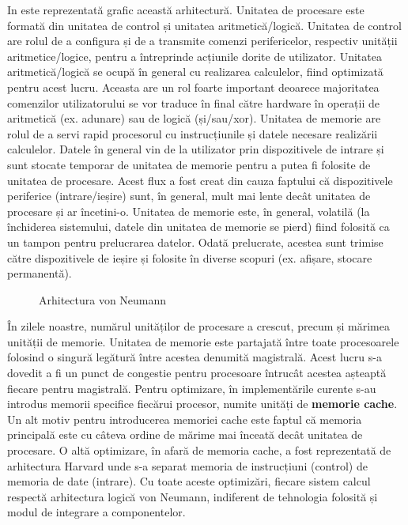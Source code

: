 In  este reprezentată grafic această
arhitectură. Unitatea de procesare este formată din unitatea de control și
unitatea aritmetică/logică. Unitatea de control are rolul de a configura și de a transmite
comenzi perifericelor, respectiv unității aritmetice/logice, pentru a
întreprinde acțiunile dorite de utilizator. Unitatea aritmetică/logică se ocupă
în general cu realizarea calculelor, fiind optimizată pentru acest lucru.
Aceasta are un rol foarte important deoarece majoritatea comenzilor
utilizatorului se vor traduce în final către hardware în operații de aritmetică
(ex. adunare) sau de logică (și/sau/xor). Unitatea de memorie are rolul de a
servi rapid procesorul cu instrucțiunile și datele necesare realizării calculelor. Datele în
general vin de la utilizator prin dispozitivele de intrare și sunt stocate
temporar de unitatea de memorie pentru a putea fi folosite de unitatea de
procesare. Acest flux a fost creat din cauza faptului că dispozitivele
periferice (intrare/ieșire) sunt, în general, mult mai lente decât unitatea de
procesare și ar încetini-o. Unitatea de memorie este, în general, volatilă (la
închiderea sistemului, datele din unitatea de memorie se pierd) fiind folosită
ca un tampon pentru prelucrarea datelor. Odată prelucrate, acestea sunt trimise
către dispozitivele de ieșire și folosite în diverse scopuri (ex. afișare, stocare
permanentă).

\begin{figure}[!htbp]
  \centering
  \def\svgwidth{0.8\columnwidth}
  
  \caption{Arhitectura von Neumann}
  \label{fig:hw:von-neumann}
\end{figure}

În zilele noastre, numărul unităților de procesare a crescut, precum și mărimea
unității de memorie. Unitatea de memorie este partajată între toate
procesoarele folosind o singură legătură între acestea denumită magistrală.
Acest lucru s-a dovedit a fi un punct de congestie pentru procesoare întrucât
acestea așteaptă fiecare pentru magistrală. Pentru optimizare, în implementările
curente s-au introdus memorii specifice fiecărui procesor, numite unități de \textbf{memorie cache}. Un alt
motiv pentru introducerea memoriei cache este faptul că memoria
principală este cu câteva ordine de mărime mai înceată decât unitatea de
procesare. O altă optimizare, în afară de memoria cache, a fost reprezentată de
arhitectura Harvard unde s-a separat memoria de instrucțiuni (control) de
memoria de date (intrare). Cu toate aceste optimizări, fiecare sistem calcul
respectă arhitectura logică von Neumann, indiferent de tehnologia folosită și
modul de integrare a componentelor.

